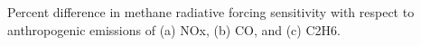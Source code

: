 Percent difference in methane radiative forcing sensitivity with respect to anthropogenic emissions of (a) NOx, (b) CO, and (c) C2H6.